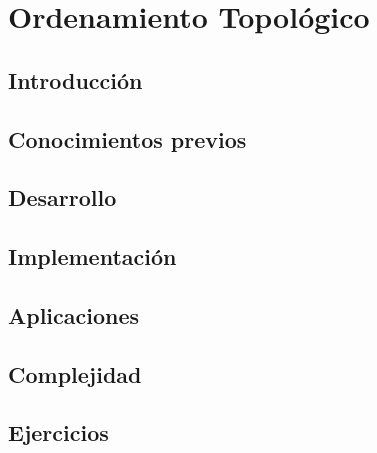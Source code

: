 \chapter{Ordenamiento Topológico}
\section{Introducción}

\section{Conocimientos previos}

\section{Desarrollo}

\section{Implementación}

\section{Aplicaciones}

\section{Complejidad}

\section{Ejercicios}

